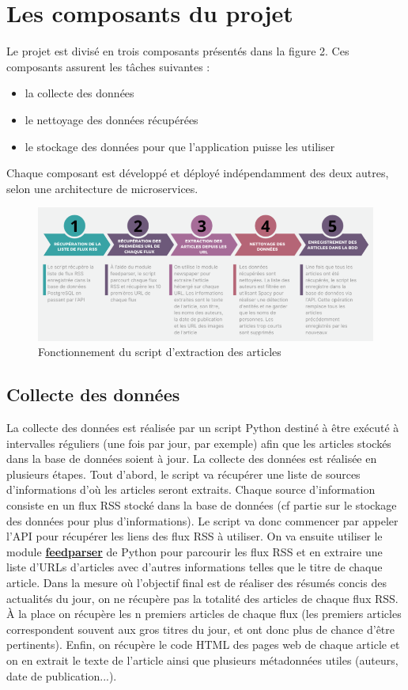 \documentclass[french]{article}
\begin{document}
    \section{Les composants du projet}
    Le projet est divisé en trois composants présentés dans la figure 2. Ces composants assurent les tâches suivantes :
    \begin{itemize}
        \item la collecte des données
        \item le nettoyage des données récupérées
        \item le stockage des données pour que l'application puisse les utiliser
    \end{itemize}
    Chaque composant est développé et déployé indépendamment des deux autres, selon une architecture de microservices.
    \begin{figure}[h]
        \includegraphics[width=15cm]{fonctionnement_script}
        \centering
        \caption{Fonctionnement du script d'extraction des articles}
        \centering
    \end{figure}
    
    \subsection{Collecte des données}

    La collecte des données est réalisée par un script Python destiné à être exécuté à intervalles réguliers (une fois par jour, par exemple) afin que les articles stockés dans la base de données soient à jour.
    La collecte des données est réalisée en plusieurs étapes. Tout d'abord, le script va récupérer une liste de sources d'informations d'où les articles seront extraits. Chaque source d'information consiste en un flux RSS stocké dans la base de données (cf partie sur le stockage des données pour plus d'informations). Le script va donc commencer par appeler l'API pour récupérer les liens des flux RSS à utiliser.
    On va ensuite utiliser le module \textbf{\href{https://pypi.org/project/feedparser/}{feedparser}} de Python pour parcourir les flux RSS et en extraire une liste d'URLs d'articles avec d'autres informations telles que le titre de chaque article. Dans la mesure où l'objectif final est de réaliser des résumés concis des actualités du jour, on ne récupère pas la totalité des articles de chaque flux RSS. À la place on récupère les n premiers articles de chaque flux (les premiers articles correspondent souvent aux gros titres du jour, et ont donc plus de chance d'être pertinents).
    Enfin, on récupère le code HTML des pages web de chaque article et on en extrait le texte de l'article ainsi que plusieurs métadonnées utiles (auteurs, date de publication...). 
\end{document}
